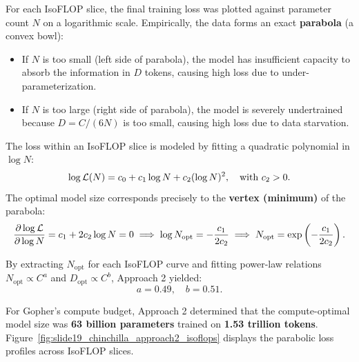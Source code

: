 \documentclass[../../main.tex]{subfiles}
\begin{document}
For each IsoFLOP slice, the final training loss was plotted against parameter count $N$ on a logarithmic scale. Empirically, the data forms an exact \textbf{parabola} (a convex bowl):
\begin{itemize}
    \item If $N$ is too small (left side of parabola), the model has insufficient capacity to absorb the information in $D$ tokens, causing high loss due to under-parameterization.
    \item If $N$ is too large (right side of parabola), the model is severely undertrained because $D = C / (6N)$ is too small, causing high loss due to data starvation.
\end{itemize}

The loss within an IsoFLOP slice is modeled by fitting a quadratic polynomial in $\log N$:
\begin{equation}
\label{eq:isoflop_parabola}
\log \mathcal{L}(N) = c_0 + c_1 \log N + c_2 (\log N)^2, \quad \text{with } c_2 > 0.
\end{equation}
The optimal model size corresponds precisely to the \textbf{vertex (minimum)} of the parabola:
\begin{equation}
\label{eq:parabola_vertex}
\frac{\partial \log \mathcal{L}}{\partial \log N} = c_1 + 2 c_2 \log N = 0 \implies \log N_{\text{opt}} = -\frac{c_1}{2 c_2} \implies N_{\text{opt}} = \exp\left(-\frac{c_1}{2 c_2}\right).
\end{equation}

By extracting $N_{\text{opt}}$ for each IsoFLOP curve and fitting power-law relations $N_{\text{opt}} \propto C^a$ and $D_{\text{opt}} \propto C^b$, Approach 2 yielded:
\begin{equation}
a = 0.49, \quad b = 0.51.
\end{equation}

For Gopher's compute budget, Approach 2 determined that the compute-optimal model size was \textbf{63 billion parameters} trained on \textbf{1.53 trillion tokens}. Figure~\ref{fig:slide19_chinchilla_approach2_isoflops} displays the parabolic loss profiles across IsoFLOP slices.
\end{document}
